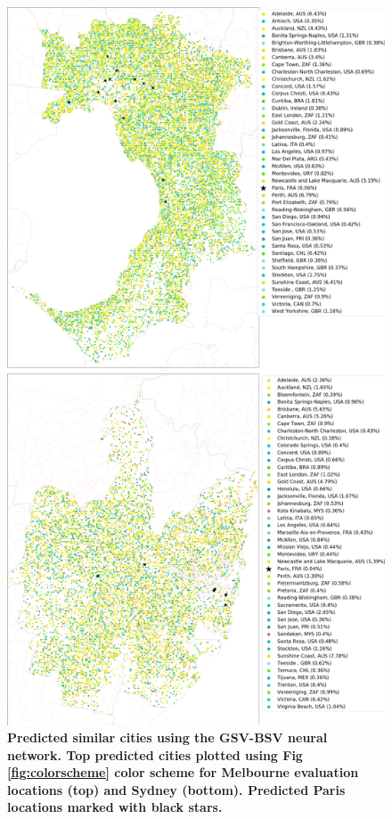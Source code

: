 \documentclass[10pt,letterpaper]{article}
\begin{document}
\begin{figure}[!htbp]
\centering    
\includegraphics[scale=0.16]{Images/PlosOne/Fig9.png} 
\caption{\bf Predicted similar cities using the GSV-BSV neural network. Top predicted cities plotted using Fig \ref{fig:colorscheme} color scheme for Melbourne evaluation locations (top) and Sydney (bottom). Predicted Paris locations marked with black stars.}   
 \label{fig:melstreet}  
\end{figure} 
\end{document}
